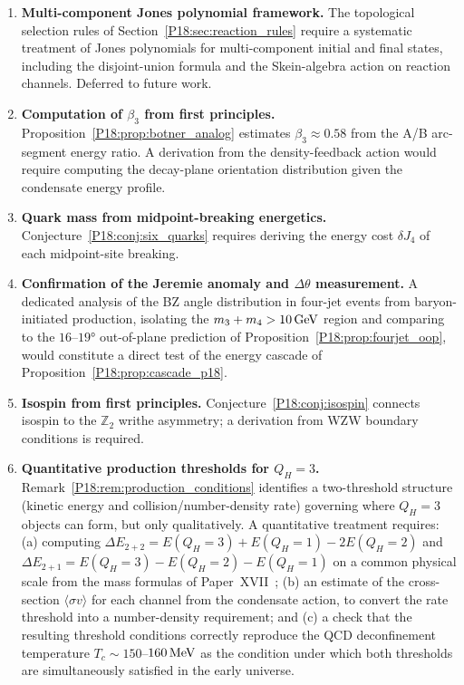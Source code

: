 \documentclass[11pt,a4paper]{article}
\theoremstyle{definition}\newtheorem{definition}[theorem]{Definition}
\theoremstyle{remark}
\newcommand{\QH}{Q_H}
\newcommand{\Ztwo}{\mathbb{Z}_2}
\begin{document}
\begin{enumerate}[leftmargin=2em,label=\textbf{O\arabic*.}]

\item \textbf{Multi-component Jones polynomial framework.}
The topological selection rules of Section~\ref{P18:sec:reaction_rules}
require a systematic treatment of Jones polynomials for
multi-component initial and final states, including the
disjoint-union formula and the Skein-algebra action on reaction
channels. Deferred to future work.

\item \textbf{Computation of $\beta_3$ from first principles.}
Proposition~\ref{P18:prop:botner_analog} estimates $\beta_3\approx0.58$
from the A/B arc-segment energy ratio.  A derivation from the
density-feedback action would require computing the decay-plane
orientation distribution given the condensate energy profile.

\item \textbf{Quark mass from midpoint-breaking energetics.}
Conjecture~\ref{P18:conj:six_quarks} requires deriving the energy
cost $\delta J_4$ of each midpoint-site breaking.

\item \textbf{Confirmation of the Jeremie anomaly and $\Delta\theta$ measurement.}
A dedicated analysis of the BZ angle distribution in
four-jet events from baryon-initiated production, isolating the
$m_3+m_4>10\,{\rm GeV}$ region and comparing to the
$16$--$19°$ out-of-plane prediction of
Proposition~\ref{P18:prop:fourjet_oop}, would constitute
a direct test of the energy cascade of
Proposition~\ref{P18:prop:cascade_p18}.

\item \textbf{Isospin from first principles.}
Conjecture~\ref{P18:conj:isospin} connects isospin to the $\Ztwo$
writhe asymmetry; a derivation from WZW boundary conditions
is required.

\item \textbf{Quantitative production thresholds for $\QH=3$.}
Remark~\ref{P18:rem:production_conditions} identifies a two-threshold
structure (kinetic energy and collision/number-density rate)
governing where $\QH=3$ objects can form, but only qualitatively.
A quantitative treatment requires: (a) computing
$\Delta E_{2+2}=E(\QH{=}3)+E(\QH{=}1)-2E(\QH{=}2)$ and
$\Delta E_{2+1}=E(\QH{=}3)-E(\QH{=}2)-E(\QH{=}1)$ on a common
physical scale from the mass formulas of Paper~XVII~\cite{Paper17};
(b) an estimate of the cross-section $\langle\sigma v\rangle$ for
each channel from the condensate action, to convert the rate
threshold into a number-density requirement; and (c) a check that
the resulting threshold conditions correctly reproduce the QCD
deconfinement temperature $T_c\sim150$--$160\,{\rm MeV}$ as the
condition under which both thresholds are simultaneously satisfied
in the early universe.


\end{enumerate}
\end{document}
